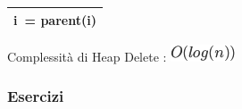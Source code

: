 \documentclass{article}
\begin{document}
\begin{longtable}[]{@{}l@{}}
\begin{minipage}[t]{0.97\columnwidth}
{\hspace*{0.333em}\hspace*{0.333em}\hspace*{0.333em}\hspace*{0.333em}\hspace*{0.333em}\hspace*{0.333em}\hspace*{0.333em}\hspace*{0.333em}\hspace*{0.333em}\hspace*{0.333em}\hspace*{0.333em}\hspace*{0.333em}\hspace*{0.333em}\hspace*{0.333em}\hspace*{0.333em}\hspace*{0.333em}\hspace*{0.333em}\hspace*{0.333em}\hspace*{0.333em}\hspace*{0.333em}\hspace*{0.333em}\hspace*{0.333em}\hspace*{0.333em}\hspace*{0.333em}\hspace*{0.333em}\hspace*{0.333em}\hspace*{0.333em}\hspace*{0.333em}\hspace*{0.333em}\hspace*{0.333em}\hspace*{0.333em}\hspace*{0.333em}}{i}{~=
parent(}{i}{)}\strut
\end{minipage}\tabularnewline
\bottomrule
\end{longtable}

{Complessità di Heap Delete : }\includegraphics{images/image144.png}

{}

\hypertarget{h.r8bopy9q4g8f}{\subsubsection{\texorpdfstring{{Esercizi}}{Esercizi}}\label{h.r8bopy9q4g8f}}
\end{document}
